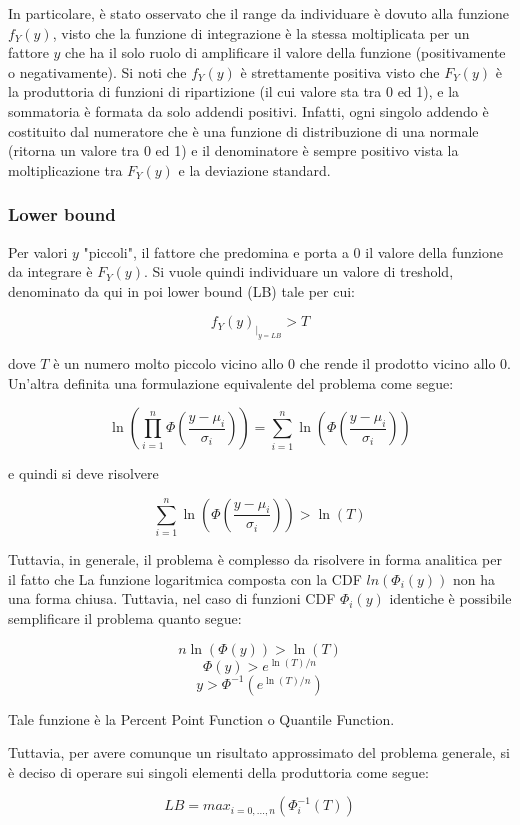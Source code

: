 In particolare, è stato osservato che il range da individuare è dovuto alla funzione $f_Y(y)$, visto che la funzione di integrazione è la stessa moltiplicata per un fattore $y$ che ha il solo ruolo di amplificare il valore della funzione (positivamente o negativamente). Si noti che $f_Y(y)$ è strettamente positiva visto che $F_Y(y)$ è la produttoria di funzioni di ripartizione (il cui valore sta tra 0 ed 1), e la sommatoria è formata da solo addendi positivi. Infatti, ogni singolo addendo è costituito dal numeratore che è una funzione di distribuzione di una normale (ritorna un valore tra 0 ed 1) e il denominatore è sempre positivo vista la moltiplicazione tra $F_Y(y)$ e la deviazione standard.


\subsubsection{Lower bound}
Per valori $y$ "piccoli", il fattore che predomina e porta a 0 il valore della funzione da integrare è $F_Y(y)$. Si vuole quindi individuare un valore di treshold, denominato da qui in poi lower bound (LB) tale per cui:

$$f_Y(y)_{|_{y = LB}} > T $$

dove $T$ è un numero molto piccolo vicino allo 0 che rende il prodotto vicino allo 0. Un'altra definita una formulazione equivalente del problema come segue:

	
$$\ln(\prod_{i = 1}^n \Phi(\frac{y - \mu_i}{\sigma_i})) = \sum_{i=1}^n  \ln(\Phi(\frac{y - \mu_i}{\sigma_i}))  $$

e quindi si deve risolvere

$$ \sum_{i=1}^n  \ln(\Phi(\frac{y - \mu_i}{\sigma_i})) > \ln(T) $$

Tuttavia, in generale, il problema è complesso da risolvere in forma analitica per il fatto che La funzione logaritmica composta con la CDF $ln(\Phi_i(y))$ non ha una forma chiusa. Tuttavia, nel caso di funzioni CDF $\Phi_i(y)$ identiche è possibile semplificare il problema quanto segue:

$$
n \ln(\Phi(y)) > \ln(T)
$$
$$
\Phi(y) > e^{\ln(T) / n}
$$
$$
y > \Phi^{-1}(e^{\ln(T) / n})
$$

Tale funzione è la Percent Point Function o Quantile Function.

Tuttavia, per avere comunque un risultato approssimato del problema generale, si è deciso di operare sui singoli elementi della produttoria come segue:

$$LB = max_{i=0,...,n}( \Phi_i^{-1}(T))$$

